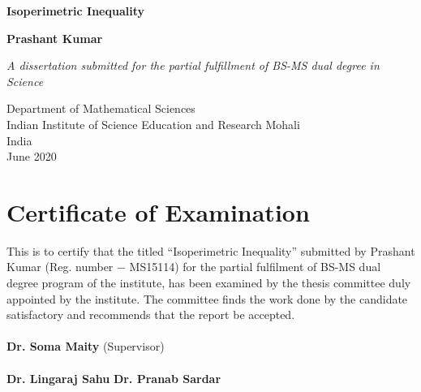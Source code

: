 \documentclass[oneside]{book}
\date{\today}
\begin{document}
	
	\begin{titlepage}
		\begin{center}
			\vspace*{1cm}
			
			\Huge
			\textbf{Isoperimetric Inequality}
			
			\vspace{0.5cm}
			\LARGE
			
			
			\vspace{1.5cm}
			
			\textbf{Prashant Kumar}
			
			\vfill
			
			\textit{A dissertation submitted for the partial fulfillment of BS-MS dual degree in Science}          
			\vspace{0.9cm}
			
			\Large
			Department of Mathematical Sciences\\
			Indian Institute of Science Education and Research Mohali\\
			India\\
			June 2020
			
		\end{center}
	\end{titlepage}
	
	
	
	
	
	\tableofcontents
	
	
	\thispagestyle{empty}
	\chapter*{Certificate of Examination}
	
	This is to certify that the titled \enquote{Isoperimetric Inequality} submitted by Prashant Kumar (Reg. number $-$ MS15114) for the partial fulfilment of BS-MS dual degree program of the institute, has been examined by the thesis committee duly appointed by the institute. The committee finds the work done by the candidate satisfactory and recommends that the report be accepted.\\\\
	\textbf{Dr. Soma Maity} (Supervisor)\\
	\\
	\textbf{Dr. Lingaraj Sahu}  \hfill           \textbf{ Dr. Pranab Sardar}\\
	\\
	\\
	\thispagestyle{empty}
	
\end{document}

